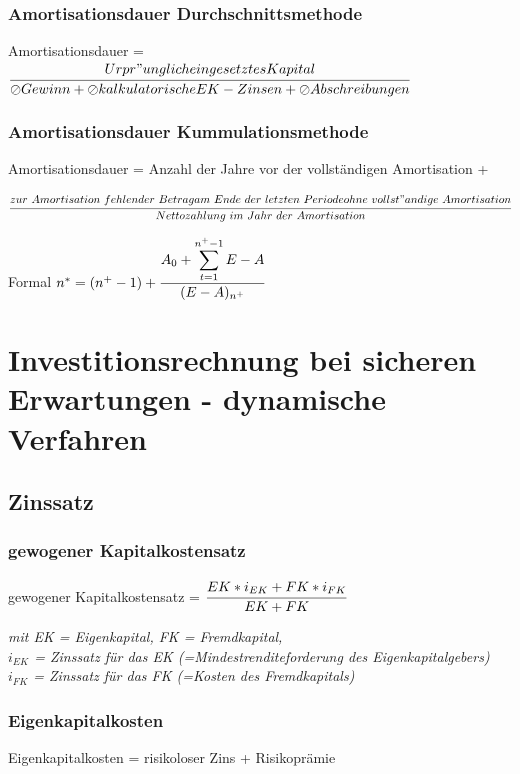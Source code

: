 \documentclass[a4paper,12pt]{scrartcl}
\begin{document}
\subsubsection{Amortisationsdauer Durchschnittsmethode}
Amortisationsdauer = $\cfrac{Urpr"unglich eingesetztes Kapital}{\oslash Gewinn + \oslash kalkulatorische EK-Zinsen + \oslash Abschreibungen}$
\subsubsection{Amortisationsdauer Kummulationsmethode}
Amortisationsdauer = Anzahl der Jahre vor der vollständigen Amortisation + \\ 
\begin{small}
$\cfrac{zur~Amortisation~fehlender~Betrag \\ am~Ende~der~letzten~Periode ohne~vollst"andige~Amortisation}{Nettozahlung~im~Jahr~der~Amortisation}$
\end{small}



Formal $n^* = (n^+ - 1) + \cfrac{A_0 + \displaystyle\sum_{t=1}^{n^+-1} E-A}{(E - A)_{n^+}}$

\section{Investitionsrechnung bei sicheren Erwartungen - dynamische Verfahren}
\subsection{Zinssatz}
\subsubsection{gewogener Kapitalkostensatz}
gewogener Kapitalkostensatz = $\cfrac{EK * i_{EK} + FK * i_{FK}}{EK + FK}$ \\
\vspace*{5mm}

\begin{small}
\textit{
mit EK = Eigenkapital, FK = Fremdkapital, \\ $i_{EK}$ = Zinssatz für das EK (=Mindestrenditeforderung des Eigenkapitalgebers) \\ $i_{FK}$ = Zinssatz für das FK (=Kosten des Fremdkapitals)
}
\end{small}
\subsubsection{Eigenkapitalkosten}
Eigenkapitalkosten = risikoloser Zins + Risikoprämie
\end{document}

